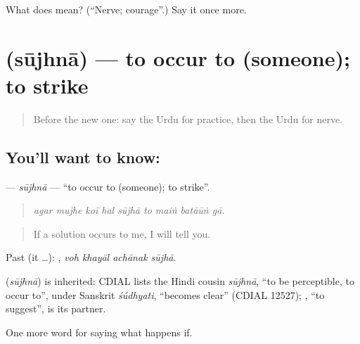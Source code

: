 \begin{tcolorbox}[breakable,colback=teal!4,colframe=teal!35!black,title={Before you move on}]
What does  mean? (\textquotedblleft{}Nerve; courage\textquotedblright{}.) Say it once more.
\end{tcolorbox}
\section[\texorpdfstring{\ur{سوجھنا} (sūjhnā)}{سوجھنا (sūjhnā)}]{ (sūjhnā) — to occur to (someone); to strike}

\label{lesson:UR-C380-sujhna}



\begin{quote}
Before the new one: say the Urdu for practice, then the Urdu for nerve.
\end{quote}

\subsection*{You'll want to know: }
\textbf{} — \emph{sūjhnā} — \textquotedblleft{}to occur to (someone); to strike\textquotedblright{}.

\begin{quote}
        
\end{quote}

\begin{quote}
\emph{agar mujhe koī hal sūjhā to maiṅ batāūṅ gā.}
\end{quote}

\begin{quote}
If a solution occurs to me, I will tell you.
\end{quote}

Past (it …):    , \emph{voh khayāl achānak sūjhā}.

\begin{cousinweb}
\textbf{} (\emph{sūjhnā}) is inherited: CDIAL lists the Hindi cousin \emph{sūjhnā}, \textquotedblleft{}to be perceptible, to occur to\textquotedblright{}, under Sanskrit \emph{śúdhyati}, \textquotedblleft{}becomes clear\textquotedblright{} (CDIAL 12527); \textbf{}, \textquotedblleft{}to suggest\textquotedblright{}, is its partner.
\end{cousinweb}

\begin{grammarlens}[title={What you've built}]
One more word for saying what happens if.
\end{grammarlens}

